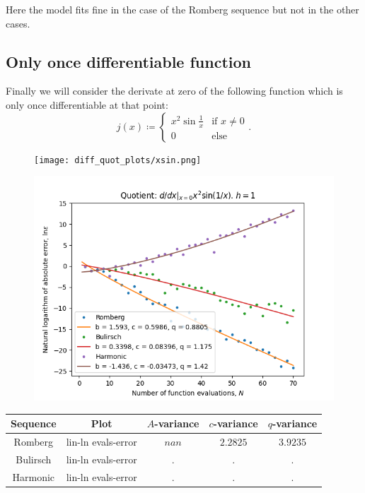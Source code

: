 Here the model fits fine in the case of the Romberg sequence but not in the other cases.

\subsection{Only once differentiable function}

Finally we will consider the derivate at zero of the following function which is only once differentiable at that point:
\[
j(x)\coloneqq \begin{cases}
x^2\sin\frac{1}{x} & \text{if } x \neq 0\\
0 & \text{else}
\end{cases}.
\]

\begin{figure}[H]
\centering
\begin{minipage}{0.45\textwidth}
\centering
\texttt{[image: diff\_quot\_plots/xsin.png]}
\end{minipage}
\begin{minipage}{0.45\textwidth}
\centering
\includegraphics[scale=0.45]{diff_quot_plots/xsin_hp_trend.png}
\end{minipage}
\end{figure}

\begin{table}[H]
    \centering
    \begin{tabular}{c|c||c|c|c}
Sequence & Plot & \(A\)-variance & \(c\)-variance & \(q\)-variance\\\hline
Romberg & lin-ln evals-error & \(nan\) & \(2.2825\) & \(3.9235\) \\
Bulirsch & lin-ln evals-error & . & . & . \\
Harmonic & lin-ln evals-error & . & . & . \\
    \end{tabular}
    \label{tab:my_label}
\end{table}


